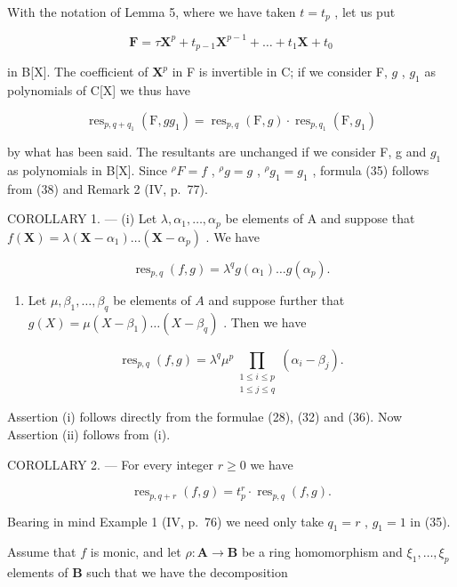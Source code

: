 With the notation of Lemma 5, where we have taken \(t = t_p\) , let us put

\[
\mathbf {F} = \tau \mathbf {X} ^ {p} + t _ {p - 1} \mathbf {X} ^ {p - 1} + \dots + t _ {1} \mathbf {X} + t _ {0}\tag{37}
\]

in B{[}X{]}. The coefficient of \(\mathbf{X}^p\) in F is invertible in C; if we consider F, \(g\) , \(g_1\) as polynomials of C{[}X{]} we thus have

\[
\operatorname{res} _ {p, q + q _ {1}} (\mathrm{F}, g g _ {1}) = \operatorname{res} _ {p, q} (\mathrm{F}, g) \cdot \operatorname{res} _ {p, q _ {1}} (\mathrm{F}, g _ {1})\tag{38}
\]

by what has been said. The resultants are unchanged if we consider F, g and \(g_{1}\) as polynomials in B{[}X{]}. Since \( {}^{\rho}F = f\) , \( {}^{\rho}g = g\) , \( {}^{\rho}g_{1} = g_{1}\) , formula (35) follows from (38) and Remark 2 (IV, p.~77).

COROLLARY 1. --- (i) Let \(\lambda, \alpha_{1}, \ldots, \alpha_{p}\) be elements of A and suppose that \(f(\mathbf{X}) = \lambda(\mathbf{X} - \alpha_{1}) \ldots (\mathbf{X} - \alpha_{p})\) . We have

\[
\operatorname{res} _ {p, q} (f, g) = \lambda^ {q} g (\alpha_ {1}) \dots g (\alpha_ {p}).\tag{39}
\]

\begin{enumerate}
\def\labelenumi{(\roman{enumi})}
\setcounter{enumi}{1}
\tightlist
\item
  Let \(\mu, \beta_1, \ldots, \beta_q\) be elements of \(A\) and suppose further that \(g(X) = \mu(X - \beta_1) \ldots (X - \beta_q)\) . Then we have
\end{enumerate}

\[
\operatorname{res}_{p,q}(f,g) = \lambda^{q}\mu^{p}\prod_{\substack{1\leqslant i\leqslant p\\ 1\leqslant j\leqslant q}}\left(\alpha_{i} - \beta_{j}\right).\tag{40}
\]

Assertion (i) follows directly from the formulae (28), (32) and (36). Now Assertion (ii) follows from (i).

COROLLARY 2. --- For every integer \(r \geqslant 0\) we have

\[
\operatorname{res} _ {p, q + r} (f, g) = t _ {p} ^ {r} \cdot \operatorname{res} _ {p, q} (f, g).\tag{41}
\]

Bearing in mind Example 1 (IV, p.~76) we need only take \(q_{1} = r\) , \(g_{1} = 1\) in (35).

Assume that \(f\) is monic, and let \(\rho: \mathbf{A} \to \mathbf{B}\) be a ring homomorphism and \(\xi_{1}, \ldots, \xi_{p}\) elements of \(\mathbf{B}\) such that we have the decomposition

